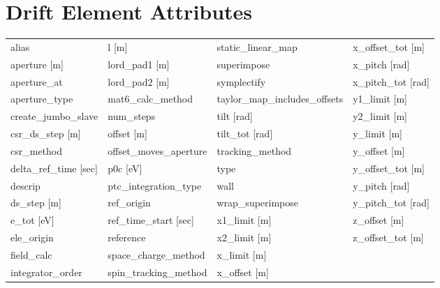  \section{Drift Element Attributes}
 \label{s:list.drift}
 
 \begin{tabular}{llll} \toprule
alias                            & l [m]                            & static_linear_map                & x_offset_tot [m]                 \\
aperture [m]                     & lord_pad1 [m]                    & superimpose                      & x_pitch [rad]                    \\
aperture_at                      & lord_pad2 [m]                    & symplectify                      & x_pitch_tot [rad]                \\
aperture_type                    & mat6_calc_method                 & taylor_map_includes_offsets      & y1_limit [m]                     \\
create_jumbo_slave               & num_steps                        & tilt [rad]                       & y2_limit [m]                     \\
csr_ds_step [m]                  & offset [m]                       & tilt_tot [rad]                   & y_limit [m]                      \\
csr_method                       & offset_moves_aperture            & tracking_method                  & y_offset [m]                     \\
delta_ref_time [sec]             & p0c [eV]                         & type                             & y_offset_tot [m]                 \\
descrip                          & ptc_integration_type             & wall                             & y_pitch [rad]                    \\
ds_step [m]                      & ref_origin                       & wrap_superimpose                 & y_pitch_tot [rad]                \\
e_tot [eV]                       & ref_time_start [sec]             & x1_limit [m]                     & z_offset [m]                     \\
ele_origin                       & reference                        & x2_limit [m]                     & z_offset_tot [m]                 \\
field_calc                       & space_charge_method              & x_limit [m]                      &                                  \\
integrator_order                 & spin_tracking_method             & x_offset [m]                     &                                  \\
 \bottomrule
 \end{tabular}
 \vfill
 
